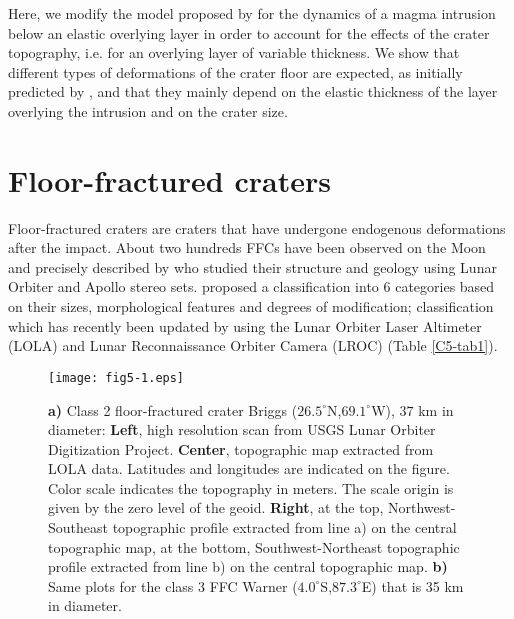 Here, we modify  the model proposed by  \citet{Michaut:2011kg} for the
dynamics  of a  magma intrusion  below an  elastic overlying  layer in
order to account for the effects of the crater topography, i.e. for an
overlying layer of  variable thickness.  We show  that different types
of  deformations  of  the  crater floor  are  expected,  as  initially
predicted by  \citet{Schultz:1976kt}, and  that they mainly  depend on
the elastic thickness of the layer  overlying the intrusion and on the
crater size.

\section{Floor-fractured craters}
\label{C5-FFC}

Floor-fractured  craters are  craters that  have undergone  endogenous
deformations  after the  impact.  About  two hundreds  FFCs have  been
observed on the Moon and precisely described by \citet{Schultz:1976kt}
who studied their structure and geology using Lunar Orbiter and Apollo
stereo sets.  \citet{Schultz:1976kt} proposed  a classification into 6
categories based on their sizes, morphological features and degrees of
modification;  classification  which  has  recently  been  updated  by
\citet{Jozwiak:2012dq} using the Lunar  Orbiter Laser Altimeter (LOLA)
and Lunar Reconnaissance Orbiter Camera (LROC) (Table \ref{C5-tab1}).

\begin{figure}[h!]
  \graphicspath{ {/Users/thorey/Documents/These/Submission/Article/FFC_JGR_2013/Paper_APRES_2nd_REVIEW/} }
  \begin{center}
    \texttt{[image: fig5-1.eps]}
    \caption{\textbf{a)}   Class  2   floor-fractured  crater   Briggs
      ($26.5^{\circ}$N,$69.1^{\circ}$W),   $37$    km   in   diameter:
      \textbf{Left},  high resolution  scan  from  USGS Lunar  Orbiter
      Digitization Project. \textbf{Center}, topographic map extracted
      from LOLA  data. Latitudes and  longitudes are indicated  on the
      figure.  Color  scale indicates  the topography in  meters.  The
      scale  origin  is  given  by   the  zero  level  of  the  geoid.
      \textbf{Right},  at  the  top,  Northwest-Southeast  topographic
      profile extracted from  line a) on the  central topographic map,
      at the bottom, Southwest-Northeast topographic profile extracted
      from line b)  on the central topographic  map.  \textbf{b)} Same
      plots      for       the      class      3       FFC      Warner
      ($4.0^{\circ}$S,$87.3^{\circ}$E) that is 35 km in diameter.}
    \label{C5-fig5-1}
  \end{center}
\end{figure}
	
